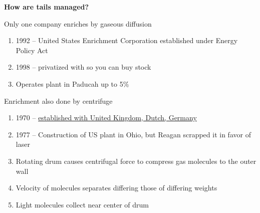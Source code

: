 \documentclass[aspectratio=1610,pdftex,dvipsnames,compress,xcolor={dvipsnames}]{beamer}
\begin{document}
\begin{frame}[plain]{}
    \centering\LARGE\textbf{How are tails managed?}
\end{frame}


\addtocounter{framenumber}{-1} 
\begin{frame}{Only one company enriches by gaseous diffusion}
    \begin{enumerate}[topsep=0pt,itemsep=21pt,leftmargin=*,label=(\arabic*)]
        \item[]1992 -- United States Enrichment Corporation established under Energy Policy Act
        \item[]1998 -- privatized with so you can buy stock
        \item[]Operates plant in Paducah up to 5\%
    \end{enumerate}
\end{frame}


\begin{frame}{Enrichment also done by centrifuge}
    \begin{enumerate}[topsep=0pt,itemsep=21pt,leftmargin=*,label=(\arabic*)]
        \item[]1970 -- \href{https://urenco.com/}{established with United Kingdom, Dutch, Germany}
        \item[]1977 -- Construction of US plant in Ohio, but Reagan scrapped it in favor of laser
        \item[]Rotating drum causes centrifugal force to compress gas molecules to the outer wall
        \item[]Velocity of molecules separates differing those of differing weights
        \item[]Light molecules collect near center of drum
    \end{enumerate}
\end{frame}
\end{document}

